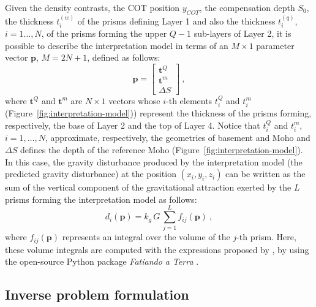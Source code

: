 \documentclass[manuscript]{geophysics}
\begin{document}
Given the density contrasts, the COT position $y_{COT}$, the compensation
depth $S_{0}$, the thickness $t^{(w)}_{i}$ of the prisms defining Layer 1 and 
also the thickness $t^{(q)}_{i}$, $i = 1 \dots, N$, of the prisms forming the 
upper $Q-1$ sub-layers of Layer 2, it is possible to describe the interpretation
model in terms of an $M \times 1$ parameter vector $\mathbf{p}$, $M = 2N + 1$, defined
as follows:
\begin{equation}
\mathbf{p} = \begin{bmatrix}
\mathbf{t}^{Q} \\
\mathbf{t}^{m} \\
\Delta S
\end{bmatrix} \: ,
\label{eq:parameter-vector}
\end{equation}
where $\mathbf{t}^{Q}$ and $\mathbf{t}^{m}$ are $N \times 1$ vectors whose $i$-th
elements $t^{Q}_{i}$ and $t^{m}_{i}$ (Figure~\ref{fig:interpretation-model})) 
represent the thickness of the
prisms forming, respectively, the base of Layer 2 and the top of Layer 4.
Notice that $t^{Q}_{i}$ and $t^{m}_{i}$, $i = 1, \dots, N$, approximate, respectively, the 
geometries of basement and Moho and $\Delta S$ defines the depth of the
reference Moho (Figure~\ref{fig:interpretation-model}).
In this case, the gravity disturbance produced by the interpretation model (the
predicted gravity disturbance) at the position $(x_{i}, y_{i}, z_{i})$ can be written
as the sum of the vertical component of the gravitational attraction exerted by the $L$
prisms forming the interpretation model as follows:
\begin{equation}
d_{i}(\mathbf{p}) = k_{g} \, G \, \sum_{j = 1}^{L} f_{ij}(\mathbf{p}) \: ,
\label{eq:ith-predicted-data}
\end{equation}
where $f_{ij}(\mathbf{p})$ represents an integral over the volume of the $j$-th 
prism. Here, these volume integrals are computed with the expressions proposed 
by \citet{nagy-etal2000}, by using the open-source Python package 
\textit{Fatiando a Terra} \citep{uieda-etal2013}.


\subsection{Inverse problem formulation}
\end{document}
